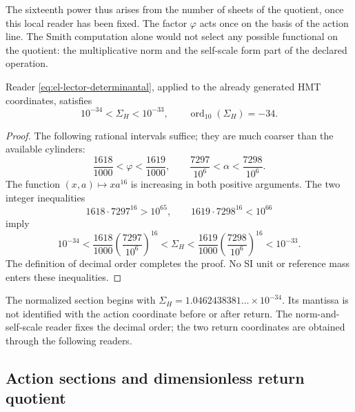 The sixteenth power thus arises from the number of sheets of the quotient,
once this local reader has been fixed. The factor \(\varphi\) acts once on
the basis of the action line. The Smith computation alone would not
select any possible functional on the quotient: the multiplicative
norm and the self-scale form part of the declared operation.

\begin{theorem}
Reader \eqref{eq:el-lector-determinantal}, applied to the already generated
HMT coordinates, satisfies
\begin{equation}
 10^{-34}<\Sigma_H<10^{-33},\qquad
 \operatorname{ord}_{10}(\Sigma_H)=-34.
 \label{eq:el-decada}
\end{equation}
\end{theorem}
\begin{proof}
The following rational intervals suffice; they are much coarser than the available
cylinders:
\[
 \frac{1618}{1000}<\varphi<\frac{1619}{1000},\qquad
 \frac{7297}{10^6}<\alpha<\frac{7298}{10^6}.
\]
The function \((x,a)\mapsto xa^{16}\) is increasing in both positive
arguments. The two integer inequalities
\[
 1618\cdot7297^{16}>10^{65},\qquad
 1619\cdot7298^{16}<10^{66}
\]
imply
\[
 10^{-34}
 <\frac{1618}{1000}\left(\frac{7297}{10^6}\right)^{16}
 <\Sigma_H
 <\frac{1619}{1000}\left(\frac{7298}{10^6}\right)^{16}
 <10^{-33}.
\]
The definition of decimal order completes the proof. No SI
unit or reference mass enters these inequalities.
\end{proof}

The normalized section begins with
\(\Sigma_H=1.0462438381\ldots\times10^{-34}\). Its mantissa is not
identified with the action coordinate before or after return.
The norm-and-self-scale reader fixes the decimal order; the two return
coordinates are obtained through the following readers.




\subsection{Action sections and dimensionless return quotient}

